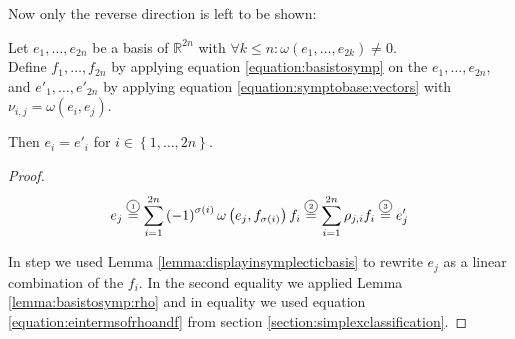 \documentclass[../SymplecticSimplices.tex]{subfiles}
\begin{document}
Now only the reverse direction is left to be shown:

\begin{lemma}
  Let \( e_1, \dots, e_{2n} \) be a basis of \( \mathbb{R}^{2n} \) with \( \forall k \leq n : \omega \left( e_1, \dots, e_{2k} \right) \neq 0 \).\\
  Define \( f_1, \dots, f_{2n} \) by applying equation \eqref{equation:basistosymp} on the \( e_1, \dots, e_{2n} \), and \( e'_1, \dots, e'_{2n} \) by applying equation \eqref{equation:symptobase:vectors} with \( \nu_{i,j} = \omega \left( e_i, e_j \right) \).

  Then \( e_i = e'_i \) for \( i \in \left\lbrace 1, \dots, 2n \right\rbrace \).
\end{lemma}

\begin{proof}
  \begin{equation*}
    e_j \eqcom{1} \sum \limits _{i = 1} ^{2n} \left( -1 \right)^{\sigma \left( i \right)} \omega \left( e_j, f_{\sigma \left( i \right)} \right) f_i \eqcom{2} \sum \limits _{i = 1} ^{2n} \limits \rho_{j,i} f_i \eqcom{3} e'_j
  \end{equation*}
  
  In step  we used Lemma \ref{lemma:displayinsymplecticbasis} to rewrite \( e_j \) as a linear combination of the \( f_i\). In the second equality  we applied Lemma \ref{lemma:basistosymp:rho} and in equality  we used equation \eqref{equation:eintermsofrhoandf} from section \ref{section:simplexclassification}.
\end{proof}
\end{document}
